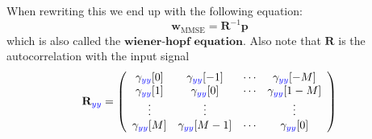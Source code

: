 When rewriting this we end up with the following equation:
$$
\boldsymbol{w}_{\mathrm{MMSE}}=\boldsymbol{R}^{-1} \boldsymbol{p}
$$
which is also called the $\textbf{wiener-hopf equation}$. Also note that $\mathbf{R}$ is the autocorrelation with the input signal
$$
\mathbf{R}_{\textcolor{blue}{y y}}=\left(\begin{array}{cccc}
\gamma_{\textcolor{blue}{y y}}[0] & \gamma_{\textcolor{blue}{y y}}[-1] & \cdots & \gamma_{\textcolor{blue}{y y}}[-M] \\
\gamma_{\textcolor{blue}{y y}}[1] & \gamma_{\textcolor{blue}{y y}}[0] & \cdots & \gamma_{\textcolor{blue}{y y}}[1-M] \\
\vdots & \vdots & & \vdots \\
\gamma_{\textcolor{blue}{y y}}[M] & \gamma_{\textcolor{blue}{y y}}[M-1] & \cdots & \gamma_{\textcolor{blue}{y y}}[0]
\end{array}\right)
$$

